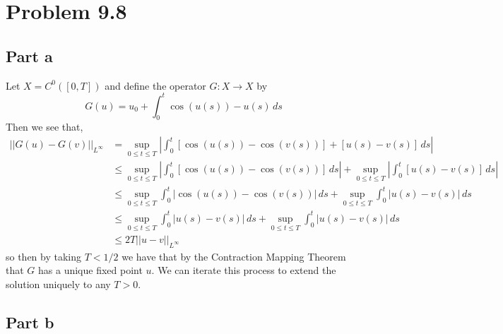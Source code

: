 \documentclass[12pt]{report}
\newcommand{\norm}[1]{\left|\left|#1\right|\right|}
\begin{document}
\maketitle

\section*{Problem 9.8}
\subsection*{Part a}
Let $X = C^0([0,T])$ and define the operator $G: X \to X$ by
\begin{equation*}
G(u) = u_0 + \int_0^t \cos(u(s)) - u(s) \, ds
\end{equation*}
Then we see that,
\begin{align*}
  \norm{G(u) - G(v)}_{L^\infty} &= \sup_{0 \leq t \leq T} \left|\int_0^t [\cos(u(s)) - \cos(v(s))] + [u(s) - v(s)] \, ds\right| \\
  &\leq \sup_{0 \leq t \leq T} \left| \int_0^t [\cos(u(s)) - \cos(v(s))] \, ds \right| + \sup_{0 \leq t \leq T} \left| \int_0^t [u(s) - v(s)] \, ds \right| \\
  &\leq \sup_{0 \leq t \leq T} \int_0^t \left| \cos(u(s)) - \cos(v(s)) \right| \, ds + \sup_{0 \leq t \leq T} \int_0^t |u(s) - v(s)| \, ds \\ 
  &\leq \sup_{0 \leq t \leq T} \int_0^t |u(s) - v(s)| \, ds + \sup_{0 \leq t \leq T} \int_0^t |u(s) - v(s)| \, ds \\
  &\leq 2T \norm{u - v}_{L^\infty}
\end{align*}
so then by taking $T < 1/2$ we have that by the Contraction Mapping Theorem that $G$ has a unique fixed point $u$. We can iterate this process to extend the solution uniquely to any $T > 0$.
\subsection*{Part b}
\end{document}
